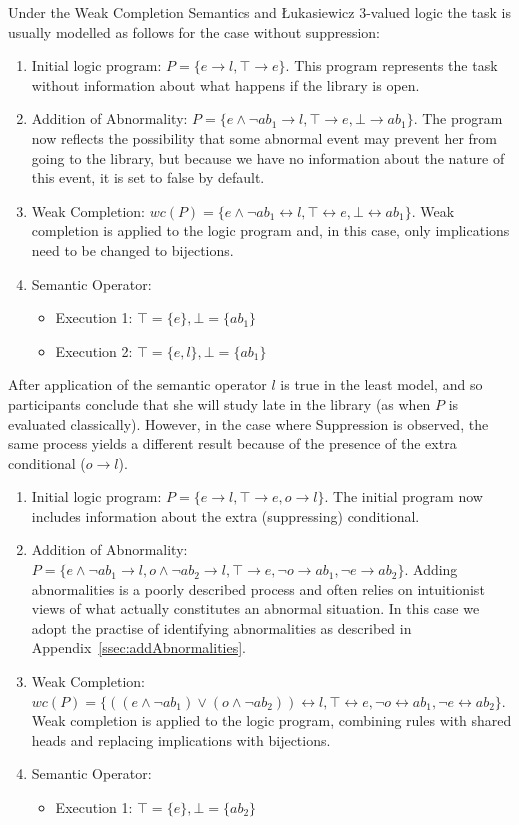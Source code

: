 \documentclass{article}
\begin{document}
Under the Weak Completion Semantics and \L ukasiewicz 3-valued logic the task is usually modelled as follows for the case without suppression:
\begin{enumerate}
\item Initial logic program: $P = \{e \rightarrow l, \top \rightarrow e \}$. This program represents the task without information about what happens if the library is open.
\item Addition of Abnormality: $P = \{e \land \lnot ab_1 \rightarrow l, \top \rightarrow e, \bot \rightarrow ab_1 \}$. The program now reflects the possibility that some abnormal event may prevent her from going to the library, but because we have no information about the nature of this event, it is set to false by default.
\item Weak Completion: $wc(P) = \{e \land \lnot ab_1 \leftrightarrow l, \top \leftrightarrow e, \bot \leftrightarrow ab_1 \}$. Weak completion is applied to the logic program and, in this case, only implications need to be changed to bijections.
\item Semantic Operator:
\begin{itemize}
\item Execution 1: $\top=\{e\}, \bot=\{ab_1\}$
\item Execution 2: $\top=\{e,l\}, \bot=\{ab_1\}$
\end{itemize}
\end{enumerate}

After application of the semantic operator $l$ is true in the least model, and so participants conclude that she will study late in the library (as when $P$ is evaluated classically). However, in the case where Suppression is observed, the same process yields a different result because of the presence of the extra conditional ($o\rightarrow l$).
\begin{enumerate}
\item Initial logic program: $P = \{e \rightarrow l, \top \rightarrow e, o \rightarrow l \}$. The initial program now includes information about the extra (suppressing) conditional.
\item Addition of Abnormality: $P = \{e \land \lnot ab_1 \rightarrow l, o \land \lnot ab_2 \rightarrow l, \top \rightarrow e, \lnot o \rightarrow ab_1, \lnot e \rightarrow ab_2 \}$. Adding abnormalities is a poorly described process and often relies on intuitionist views of what actually constitutes an abnormal situation. In this case we adopt the practise of identifying abnormalities as described in Appendix~\ref{ssec:addAbnormalities}.
\item Weak Completion: $wc(P) = \{((e \land \lnot ab_1) \lor (o \land \lnot ab_2)) \leftrightarrow l, \top \leftrightarrow e, \lnot o \leftrightarrow ab_1, \lnot e \leftrightarrow ab_2 \}$. Weak completion is applied to the logic program, combining rules with shared heads and replacing implications with bijections.
\item Semantic Operator:
\begin{itemize}
\item Execution 1: $\top=\{e\}, \bot=\{ab_2\}$
\end{itemize}
\end{enumerate}
\end{document}
